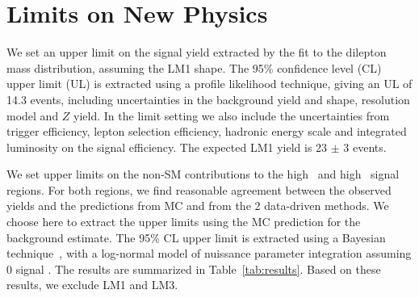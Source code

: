 \section{Limits on New Physics}
\label{sec:limit}

We set an upper limit on the signal yield extracted by the fit to the dilepton mass
distribution, assuming the LM1 shape. The 95\% confidence level (CL) upper limit (UL)
is extracted using a profile likelihood technique, giving an UL of 14.3 events, including
uncertainties in the background yield and shape, resolution model and $Z$ yield.
In the limit setting we also include the uncertainties from trigger efficiency,
lepton selection efficiency, hadronic energy scale and integrated luminosity on the signal efficiency.
The expected LM1 yield is 23 $\pm$ 3 events. 

We set upper limits on the non-SM contributions to the high \MET\ and high \Ht\ signal regions. 
For both regions, we find reasonable agreement between the observed yields and the predictions from MC and from the 2
data-driven methods. We choose here to extract the upper limits using the MC prediction for the
background estimate. The 95\% CL upper limit is extracted using a Bayesian technique~\cite{ref:cl95cms}, 
with a log-normal model of nuissance parameter integration assuming 0 signal . The results are summarized in 
Table~\ref{tab:results}. Based on these results, we exclude LM1 and LM3.

